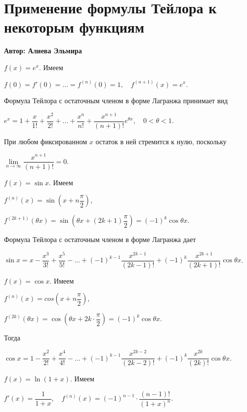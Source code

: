 \setcounter{object}{0}
\setcounter{approval}{0}
\setcounter{theorem}{0}
\setcounter{example}{0}

\chapter{Применение формулы Тейлора к некоторым функциям}
\centerline{ \bf Автор: Алиева Эльмира} \vskip 1cm
\quad{} $f(x)=e^x$. Имеем
\begin{center}
$f(0)=f'(0)=...=f^{(n)}(0)=1, \quad f^{(n+1)}(x)=e^x$.
\end{center}
Формула Тейлора с остаточным членом в форме Лагранжа принимает вид
\begin{center}
$e^x=1+\dfrac{x}{1!}+\dfrac{x^2}{2!}+...+\dfrac{x^n}{n!}+\dfrac{x^{n+1}}{(n+1)!}e^{\theta x}, \quad 0<\theta <1.$
\end{center}
При любом фиксированном $x$ остаток в ней стремится к нулю, поскольку
\begin{center}
$\lim\limits_{n\to\infty}\dfrac{x^{n+1}}{(n+1)!} = 0$.
\end{center}
\quad{}$f(x) = \sin x$. Имеем
\begin{center}
$f^{(n)}(x) = \sin\left(x+n \dfrac{\pi}{2}\right)$,
\end{center}
\begin{center}
$f^{(2k+1)}(\theta x)=\sin\left(\theta x+(2k+1) \dfrac{\pi}{2}\right)=(-1)^k \cos\theta x.$
\end{center}
Формула Тейлора с остаточным членом в форме Лагранжа дает
\begin{center}
$\sin x=x-\dfrac{x^3}{3!}+\dfrac{x^5}{5!}-...+(-1)^{k-1}\dfrac{x^{2k-1}}{(2k-1)!}+(-1)^k\dfrac{x^{2k+1}}{(2k+1)!} \cos \theta x$.
\end{center}
\quad{} $f(x)=\cos x$. Имеем
\begin{center}
$f^{(n)}(x)=cos\left(x+n \dfrac{\pi}{2}\right)$,
\end{center}
\begin{center}
$f^{(2k)}(\theta x)=\cos\left(\theta x+2k\cdot\dfrac{\pi}{2}\right)=(-1)^k\cos\theta x$.
\end{center}
Тогда
\begin{center}
$\cos x=1-\dfrac{x^2}{2!}+\dfrac{x^4}{4!}-...+(-1)^{k-1}\dfrac{x^{2k-2}}{(2k-2)!}+(-1)^k\dfrac{x^{2k}}{(2k)!}\cos\theta x$.
\end{center}
\quad{} $f(x)=\ln(1+x)$. Имеем
\begin{center}
$f'(x)=\dfrac{1}{1+x}, \quad f^{(n)}(x)=(-1)^{n-1}\cdot\dfrac{(n-1)!}{(1+x)^n}$.
\end{center}
